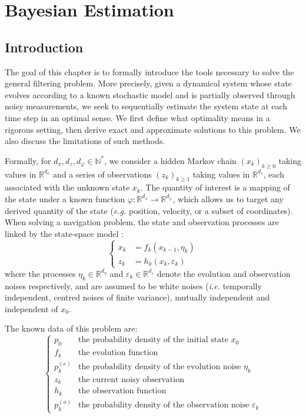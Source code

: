 \chapter{Bayesian Estimation}\label{sec:Bayesian_estimation}

\vfill
\localtableofcontents
\vfill
\newpage

\section{Introduction}

The goal of this chapter is to formally introduce the tools necessary to solve the general filtering problem. More precisely, given a dynamical system whose state evolves according to a known stochastic model and is partially observed through noisy measurements, we seek to sequentially estimate the system state at each time step in an optimal sense. We first define what optimality means in a rigorous setting, then derive exact and approximate solutions to this problem. We also discuss the limitations of such methods.

Formally, for $d_x,d_z,d_{\varphi}\in\mathbb{N}^*$, we consider a hidden Markov chain $(x_k)_{k\geq0}$ taking values in $\mathbb{R}^{d_x}$ and a series of observations $(z_k)_{k\geq1}$ taking values in $\mathbb{R}^{d_z}$, each associated with the unknown state $x_k$. The quantity of interest is a mapping of the state under a known function $\varphi:\mathbb{R}^{d_x}\to\mathbb{R}^{d_{\varphi}}$, which allows us to target any derived quantity of the state (\textit{e.g.} position, velocity, or a subset of coordinates). When solving a navigation problem, the state and observation processes are linked by the state-space model \cite{bib:HMM}:
\begin{equation}
	\left\{\begin{aligned}
	x_k&=f_k(x_{k-1},\eta_k)\\
	z_k&=h_k(x_k,\varepsilon_k)
	\end{aligned}\right.\label{eq:navigation_problem}
\end{equation}
where the processes $\eta_k\in\mathbb{R}^{d_\eta}$ and $\varepsilon_k\in\mathbb{R}^{d_\varepsilon}$ denote the evolution and observation noises respectively, and are assumed to be white noises (\textit{i.e.} temporally independent, centred noises of finite variance), mutually independent and independent of $x_0$.

The known data of this problem are:
\begin{equation}
	\left\{\begin{array}{ll}
	p_0&\text{the probability density of the initial state }x_0\\
	f_k&\text{the evolution function}\\
	p_k^{(e)}&\text{the probability density of the evolution noise }\eta_k\\
	z_k&\text{the current noisy observation}\\
	h_k&\text{the observation function}\\
	p_k^{(o)}&\text{the probability density of the observation noise }\varepsilon_k
	\end{array}\right.
\end{equation}

